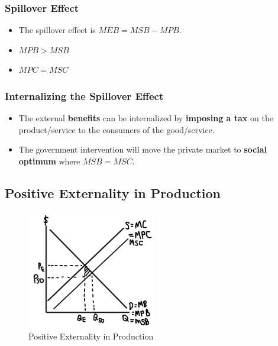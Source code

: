 \documentclass[
  letterpaper,
  DIV=11,
  numbers=noendperiod]{scrartcl}
\providecommand{\tightlist}{%
  \setlength{\itemsep}{0pt}\setlength{\parskip}{0pt}}\usepackage{longtable,booktabs,array}
\begin{document}
\subsubsection{Spillover Effect}\label{spillover-effect-1}

\begin{itemize}
\tightlist
\item
  The spillover effect is \(MEB = MSB-MPB\).
\item
  \(MPB > MSB\)
\item
  \(MPC = MSC\)
\end{itemize}

\subsubsection{Internalizing the Spillover
Effect}\label{internalizing-the-spillover-effect-1}

\begin{itemize}
\tightlist
\item
  The external \textbf{benefits} can be internalized by \textbf{imposing
  a tax} on the product/service to the consumers of the good/service.
\item
  The government intervention will move the private market to
  \textbf{social optimum} where \(MSB = MSC\).
\end{itemize}

\newpage{}

\subsection{Positive Externality in
Production}\label{positive-externality-in-production}

\begin{figure}[H]

{\centering \includegraphics[width=0.5\textwidth,height=\textheight]{img/pos-prod.png}

}

\caption{Positive Externality in Production}

\end{figure}%
\end{document}

